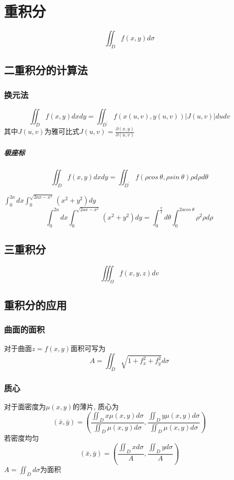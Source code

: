 \documentclass[main.tex]{subfiles}
\begin{document}
\chapter{重积分}
\[
    \iint _ {D} f(x, y) d\sigma
\]
\section{二重积分的计算法}
\subsection{换元法}
\[
    \iint _ {D} f(x, y) dx dy = \iint _ {D^{'}} f (x(u, v), y(u, v)) |J(u, v)| dudv
\]
其中$J(u, v)$为雅可比式$J(u, v) = \frac{\partial (x, y)}{\partial (u, v)}$
\paragraph{极座标}
\[
    \iint _ {D} f(x, y) dx dy = \iint _ {D^{'}} f (\rho cos\ \theta, \rho sin\ \theta) \rho d\rho d\theta
\]
\begin{example}
    {$\int_0^{2a} dx \int_0^{\sqrt{2ax-x^2}} (x^2 + y^2) dy$}
    \[
        \int_0^{2a} dx \int_0^{\sqrt{2ax-x^2}} (x^2 + y^2) dy
        = \int_0^{\frac{\pi}{2}} d\theta \int_0^{2acos\ \theta} \rho^2 \rho d\rho
    \]
    \begin{center}
    \end{center}
\end{example}
\section{三重积分}
\[
    \iiint _ {\Omega} f(x, y, z) dv
\]
\section{重积分的应用}
\subsection{曲面的面积}
对于曲面$z = f(x, y)$面积可写为
\[
    A = \iint _{D} \sqrt{1 + f_x^2 + f_y^2} d\sigma
\]
\subsection{质心}
对于面密度为$\mu (x, y)$的薄片, 质心为
\[
    (\bar{x}, \bar{y}) = (\frac{\iint _{D} x \mu (x, y) d\sigma}{\iint _{D} \mu (x, y) d\sigma}, \frac{\iint _{D} y \mu (x, y) d\sigma}{\iint _{D} \mu (x, y) d\sigma})
\]
若密度均匀
\[
    (\bar{x}, \bar{y}) = (\frac{\iint _{D} x d\sigma}{A}, \frac{\iint _{D} y d\sigma}{A})
\]
$A = \iint _{D} d\sigma$为面积
\end{document}
